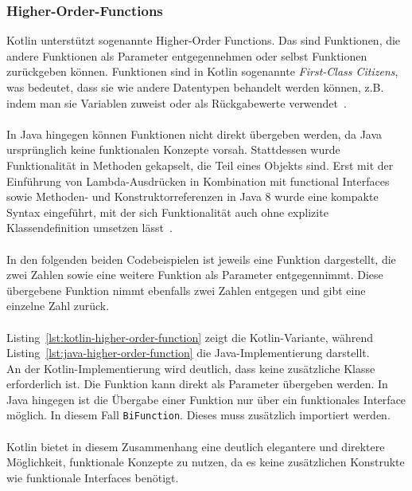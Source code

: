 \documentclass[11pt]{article}
\begin{document}
    \subsubsection{Higher-Order-Functions}
    Kotlin unterstützt sogenannte Higher-Order Functions.
    Das sind Funktionen, die andere Funktionen als Parameter entgegennehmen oder selbst Funktionen zurückgeben können.
    Funktionen sind in Kotlin sogenannte \textit{First-Class Citizens}, was bedeutet, dass sie wie andere Datentypen behandelt werden können, z.B. indem man sie Variablen zuweist oder als Rückgabewerte verwendet~\cite{kotlin-functions}.\\
    \\
    In Java hingegen können Funktionen nicht direkt übergeben werden, da Java ursprünglich keine funktionalen Konzepte vorsah.
    Stattdessen wurde Funktionalität in Methoden gekapselt, die Teil eines Objekts sind.
    Erst mit der Einführung von Lambda-Ausdrücken in Kombination mit functional Interfaces sowie Methoden- und Konstruktorreferenzen in Java 8 wurde eine kompakte Syntax eingeführt, mit der sich Funktionalität auch ohne explizite Klassendefinition umsetzen lässt~\cite[820]{insel}.\\
    \\
    In den folgenden beiden Codebeispielen ist jeweils eine Funktion dargestellt, die zwei Zahlen sowie eine weitere Funktion als Parameter entgegennimmt.
    Diese übergebene Funktion nimmt ebenfalls zwei Zahlen entgegen und gibt eine einzelne Zahl zurück.\\
    \\
    Listing~\ref{lst:kotlin-higher-order-function} zeigt die Kotlin-Variante, während Listing~\ref{lst:java-higher-order-function} die Java-Implementierung darstellt.
    \\
    An der Kotlin-Implementierung wird deutlich, dass keine zusätzliche Klasse erforderlich ist.
    Die Funktion kann direkt als Parameter übergeben werden.
    In Java hingegen ist die Übergabe einer Funktion nur über ein funktionales Interface möglich.
    In diesem Fall \texttt{BiFunction}.
    Dieses muss zusätzlich importiert werden.\\
    \\
    Kotlin bietet in diesem Zusammenhang eine deutlich elegantere und direktere Möglichkeit, funktionale Konzepte zu nutzen, da es keine zusätzlichen Konstrukte wie funktionale Interfaces benötigt.\\
    \\
\end{document}
